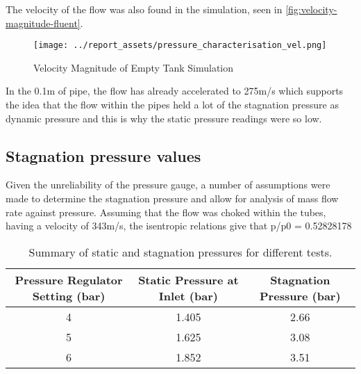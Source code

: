 The velocity of the flow was also found in the simulation, seen in \autoref{fig:velocity-magnitude-fluent}.
\begin{figure}[htbp]
    \centering
    
    \begin{minipage}{0.9\textwidth}
        \centering
        \texttt{[image: ../report\_assets/pressure\_characterisation\_vel.png]}
        \caption{Velocity Magnitude of Empty Tank Simulation}\label{fig:velocity-magnitude-fluent}
    \end{minipage}    
    
\end{figure}    
In the 0.1m of pipe, the flow has already accelerated to 275m/s which supports the idea that the flow within the pipes held a lot of the stagnation pressure as dynamic pressure and this is why the static pressure readings were so low.
\subsection{Stagnation pressure values}
Given the unreliability of the pressure gauge, a number of assumptions were made to determine the stagnation pressure and allow for analysis of mass flow rate against pressure. Assuming that the flow was choked within the tubes, having a velocity of 343m/s, the isentropic relations give that p/p0 =  0.52828178
\begin{table}[htbp]
    \centering
    \begin{tabular}{|c|c|c|}
        \hline
        Pressure Regulator Setting (bar) & Static Pressure at Inlet (bar) &  Stagnation Pressure (bar) \\
        \hline
        4 & 1.405 & 2.66 \\
        5 & 1.625 & 3.08 \\
        6 & 1.852 & 3.51 \\
        \hline
    \end{tabular}    
    \caption{Summary of static and stagnation pressures for different tests.}
    \label{tab:static-stag-pressures}
\end{table}    


\newpage
